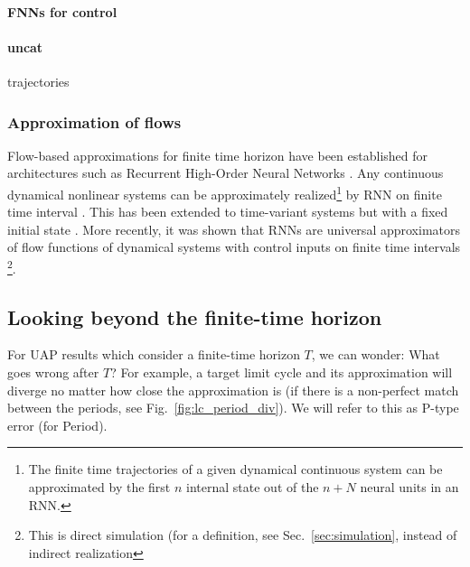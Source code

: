 \documentclass{article}
\theoremstyle{definition}
\theoremstyle{remark}
\newcommand{\reals}{\mathbb{R}}
\newcounter{ct}
\begin{document}
\paragraph{FNNs for control}
\citep{psaltis1988multilayered} \citep{li1989control,chen1992adaptive}

\paragraph{uncat}
trajectories \citep{toomarian1992learning}



\subsubsection{Approximation of flows}%
Flow-based approximations for finite time horizon have been established for architectures such as Recurrent High-Order Neural Networks \citep{kosmatopoulos1995structural}.
Any continuous dynamical nonlinear systems can be approximately realized\footnote{The finite time trajectories of a given dynamical continuous system can be approximated by the first $n$ internal state out of the $n + N$ neural units in an RNN.} by RNN on finite time interval \citep{chow2000modeling}.
%
This has been extended to time-variant systems but with a fixed initial state \citep{li2005approximation}. %
%
More recently, it was shown that RNNs are universal approximators of flow functions of dynamical systems  with control inputs on finite time intervals  \citep{aguiar2023universal}\footnote{This is direct simulation (for a definition, see Sec.~\ref{sec:simulation}, instead of indirect realization}. %


\subsection{Looking beyond the finite-time horizon}\label{sec:beyondfinitetime}

For UAP results which consider a finite-time horizon $T$, we can wonder: What goes wrong after $T$?
%
For example, a target limit cycle and its approximation will diverge no matter how close the approximation is (if there is a non-perfect match between the periods, see Fig.~\ref{fig:lc_period_div}).
We will refer to this as P-type error (for Period).
\end{document}
